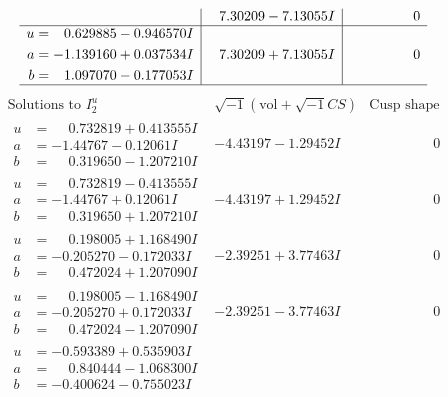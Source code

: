\documentclass[1p]{elsarticle_modified}
\theoremstyle{definition}
\newcommand{\I}{\sqrt{-1}}
\begin{document}
$$\begin{array}{c|c|c}
 & \phantom{-}7.30209 - 7.13055 I & \phantom{-0.000000 } 0 \\ \hline\begin{aligned}
u &= \phantom{-}0.629885 - 0.946570 I \\
a &= -1.139160 + 0.037534 I \\
b &= \phantom{-}1.097070 - 0.177053 I\end{aligned}
 & \phantom{-}7.30209 + 7.13055 I & \phantom{-0.000000 } 0\\
 \hline 
 \end{array}$$\newpage$$\begin{array}{c|c|c}  
\text{Solutions to }I^u_{2}& \I (\text{vol} + \sqrt{-1}CS) & \text{Cusp shape}\\
 \hline 
\begin{aligned}
u &= \phantom{-}0.732819 + 0.413555 I \\
a &= -1.44767 - 0.12061 I \\
b &= \phantom{-}0.319650 - 1.207210 I\end{aligned}
 & -4.43197 - 1.29452 I & \phantom{-0.000000 } 0 \\ \hline\begin{aligned}
u &= \phantom{-}0.732819 - 0.413555 I \\
a &= -1.44767 + 0.12061 I \\
b &= \phantom{-}0.319650 + 1.207210 I\end{aligned}
 & -4.43197 + 1.29452 I & \phantom{-0.000000 } 0 \\ \hline\begin{aligned}
u &= \phantom{-}0.198005 + 1.168490 I \\
a &= -0.205270 - 0.172033 I \\
b &= \phantom{-}0.472024 + 1.207090 I\end{aligned}
 & -2.39251 + 3.77463 I & \phantom{-0.000000 } 0 \\ \hline\begin{aligned}
u &= \phantom{-}0.198005 - 1.168490 I \\
a &= -0.205270 + 0.172033 I \\
b &= \phantom{-}0.472024 - 1.207090 I\end{aligned}
 & -2.39251 - 3.77463 I & \phantom{-0.000000 } 0 \\ \hline\begin{aligned}
u &= -0.593389 + 0.535903 I \\
a &= \phantom{-}0.840444 - 1.068300 I \\
b &= -0.400624 - 0.755023 I\end{aligned}

\end{array}$$
\end{document}
